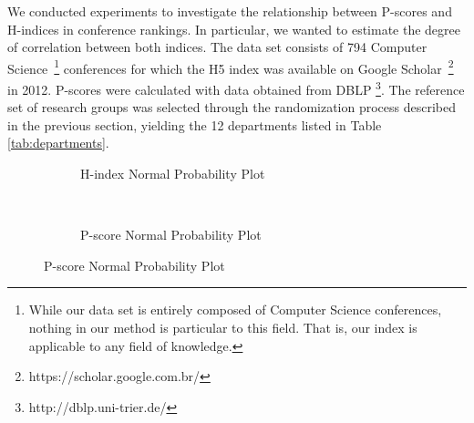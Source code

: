 \documentclass[notitlepage]{svjour3}
\begin{document}
We conducted experiments to investigate the relationship between P-scores and H-indices
in conference rankings. In particular, we wanted to estimate the degree of correlation between both 
indices. The data set consists of 794
Computer Science~\footnote{
While our data set is entirely composed of Computer Science conferences, nothing in our method is
particular to this field. That is, our index is applicable to any field of knowledge.
} 
conferences
for which the H5 index was available on Google Scholar~\footnote{https://scholar.google.com.br/}
in 2012. P-scores were calculated with
data obtained from DBLP \footnote{http://dblp.uni-trier.de/}. The reference set of research groups
was selected through the randomization process described in the previous section, 
yielding the 12 departments listed in Table \ref{tab:departments}.

\begin{figure}[ht]
\centering
  \begin{subfigure}{.475\linewidth}
  \centering
 
    \caption{H-index Normal Probability Plot}
    \label{fig:hindex_normality}
  \end{subfigure}
  ~
  \begin{subfigure}{.475\linewidth}
    \caption{P-score Normal Probability Plot}
    \label{fig:pscore_normality}
  \end{subfigure}
\end{figure}
\end{document}
